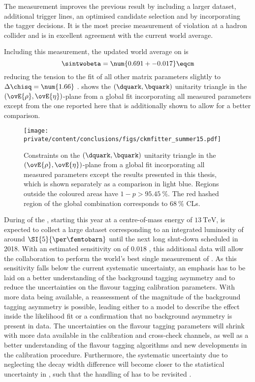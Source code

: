 The measurement improves the previous \LHCb result \cite{Aaij:1497268} by
including a larger dataset, additional trigger lines, an optimised candidate
selection and by incorporating the \SSpi tagger decisions. It is the most
precise measurement of \CP violation at a hadron collider and is in excellent
agreement with the current world average. 

Including this measurement, the updated world average on \sintwobeta
\cite{Amhis:2014hma} is
%
\begin{equation*}
  \sintwobeta = \num{0.691 +- 0.017} \eqcm
\end{equation*}
%
reducing the tension to the fit of all other \CKM matrix parameters slightly to
$\Delta\chisq = \num{1.66}$ \cite{Charles:2004jd}.
 shows the ${(\dquark,\bquark)}$ unitarity
triangle in the ${(\ovE{\rho},\ovE{\eta})}$-plane from a global fit
incorporating all measured \CKM parameters \cite{Charles:2004jd} except from the
one reported here that is additionally shown to allow for a better comparison.
%
\begin{figure}[ht]
\centering
\texttt{[image: private/content/conclusions/figs/ckmfitter\_summer15.pdf]}
\caption{Constraints on the ${(\dquark,\bquark)}$ unitarity triangle in the
${(\ovE{\rho},\ovE{\eta})}$-plane from a global fit incorporating all measured
\CKM parameters except the results presented in this thesis, which is shown
separately as a comparison in light blue. Regions outside the coloured areas
have $1-p > \SI{95.45}{\percent}$. The red hashed region of the global
combination corresponds to $\SI{68}{\percent}$ \acp{CL}. \cite{Charles:2004jd}}
\label{fig:conclusion:ckm_fitter_15}
\end{figure}

During \RunTwo of the \LHC, starting this year at a centre-of-mass energy of
$\SI{13}{\TeV}$, \LHCb is expected to collect a large dataset corresponding to
an integrated luminosity of around $\SI{5}{\per\femtobarn}$ until the next long
shut-down scheduled in 2018. With an estimated sensitivity on \SJpsiKS of
$\num{0.018}$ \cite{Moedden:2015}, this additional data will allow the \LHCb
collaboration to perform the world's best single measurement of \sintwobeta. As
this sensitivity falls below the current systematic uncertainty, an emphasis has
to be laid on a better understanding of the background tagging asymmetry and to
reduce the uncertainties on the flavour tagging calibration parameters. With
more data being available, a reassessment of the magnitude of the background
tagging asymmetry is possible, leading either to a model to describe the effect
inside the likelihood fit or a confirmation that no background asymmetry is
present in data. The uncertainties on the flavour tagging parameters will shrink
with more data available in the calibration and cross-check channels, as well as
a better understanding of the flavour tagging algorithms and new developments in
the calibration procedure. Furthermore, the systematic uncertainty due to
neglecting the decay width difference \DGd will become closer to the statistical
uncertainty in \RunTwo, such that the handling of \DGd has to be revisited
\cite{Moedden:2015}.

